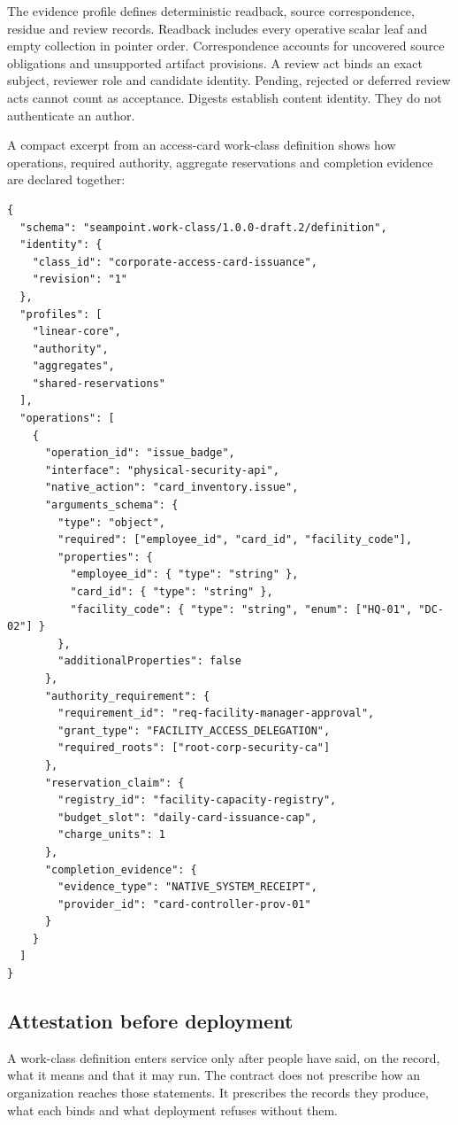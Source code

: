 \documentclass[
  american,
  11pt,
  letterpaper,
]{article}
\begin{document}
The evidence profile defines deterministic readback, source
correspondence, residue and review records. Readback includes every
operative scalar leaf and empty collection in pointer order.
Correspondence accounts for uncovered source obligations and unsupported
artifact provisions. A review act binds an exact subject, reviewer role
and candidate identity. Pending, rejected or deferred review acts cannot
count as acceptance. Digests establish content identity. They do not
authenticate an author.

A compact excerpt from an access-card work-class definition shows how
operations, required authority, aggregate reservations and completion
evidence are declared together:

\begin{lstlisting}
{
  "schema": "seampoint.work-class/1.0.0-draft.2/definition",
  "identity": {
    "class_id": "corporate-access-card-issuance",
    "revision": "1"
  },
  "profiles": [
    "linear-core",
    "authority",
    "aggregates",
    "shared-reservations"
  ],
  "operations": [
    {
      "operation_id": "issue_badge",
      "interface": "physical-security-api",
      "native_action": "card_inventory.issue",
      "arguments_schema": {
        "type": "object",
        "required": ["employee_id", "card_id", "facility_code"],
        "properties": {
          "employee_id": { "type": "string" },
          "card_id": { "type": "string" },
          "facility_code": { "type": "string", "enum": ["HQ-01", "DC-02"] }
        },
        "additionalProperties": false
      },
      "authority_requirement": {
        "requirement_id": "req-facility-manager-approval",
        "grant_type": "FACILITY_ACCESS_DELEGATION",
        "required_roots": ["root-corp-security-ca"]
      },
      "reservation_claim": {
        "registry_id": "facility-capacity-registry",
        "budget_slot": "daily-card-issuance-cap",
        "charge_units": 1
      },
      "completion_evidence": {
        "evidence_type": "NATIVE_SYSTEM_RECEIPT",
        "provider_id": "card-controller-prov-01"
      }
    }
  ]
}
\end{lstlisting}

\subsection{Attestation before
deployment}\label{attestation-before-deployment}

A work-class definition enters service only after people have said, on
the record, what it means and that it may run. The contract does not
prescribe how an organization reaches those statements. It prescribes
the records they produce, what each binds and what deployment refuses
without them.
\end{document}
